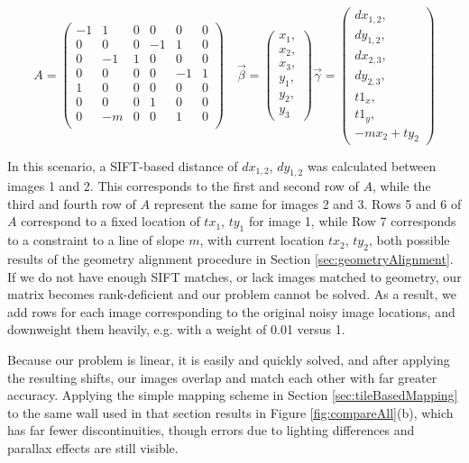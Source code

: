 \documentclass[]{spie}  %
\begin{document}
\[
A =
\begin{pmatrix}
  -1 & 1 & 0 & 0 & 0 & 0\\
  0 & 0 & 0 & -1 & 1 & 0\\
  0 & -1 & 1 & 0 & 0 & 0\\
  0 & 0 & 0 & 0 & -1 & 1\\
  1 & 0 & 0 & 0 & 0 & 0\\
  0 & 0 & 0 & 1 & 0 & 0\\
  0 & -m & 0 & 0 & 1 & 0\\
\end{pmatrix}\quad
\vec{\beta} =
\begin{pmatrix}
  x_1, \\ x_2, \\ x_3, \\ y_1, \\ y_2, \\ y_3
\end{pmatrix}
\vec{\gamma} =
\begin{pmatrix}
  dx_{1,2}, \\ dy_{1,2}, \\ dx_{2,3}, \\ dy_{2,3}, \\ t1_x, \\ t1_y, \\ -mx_2 +
  ty_2
\end{pmatrix}
\]


In this scenario, a SIFT-based distance of $dx_{1,2}$, $dy_{1,2}$ was
calculated between images 1 and 2. This corresponds to the first and
second row of $A$, while the third and fourth row of $A$ represent the
same for images 2 and 3. Rows 5 and 6 of $A$ correspond to a fixed
location of $tx_1$, $ty_1$ for image 1, while Row 7 corresponds to a
constraint to a line of slope $m$, with current location $tx_2$,
$ty_2$, both possible results of the geometry alignment procedure in
Section \ref{sec:geometryAlignment}. If we do not have enough SIFT
matches, or lack images matched to geometry, our matrix becomes
rank-deficient and our problem cannot be solved. As a result, we add
rows for each image corresponding to the original noisy image
locations, and downweight them heavily, e.g. with a weight of 0.01
versus 1.

Because our problem is linear, it is easily and quickly solved, and
after applying the resulting shifts, our images overlap and match each
other with far greater accuracy. Applying the simple mapping scheme in
Section \ref{sec:tileBasedMapping} to the same wall used in that
section results in Figure \ref{fig:compareAll}(b), which has far fewer
discontinuities, though errors due to lighting differences and
parallax effects are still visible.
\end{document}
